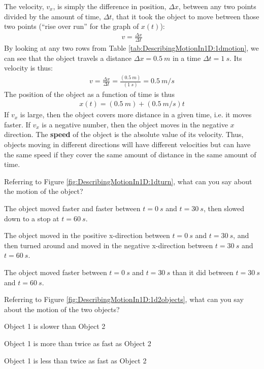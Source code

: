 The velocity, $v_x$, is simply the difference in position, $\Delta x$, between any two points divided by the amount of time, $\Delta t$, that it took the object to move between those two points (``rise over run'' for the graph of $x(t)$):
\begin{align*}
v = \frac{\Delta x}{\Delta t}
\end{align*}
By looking at any two rows from Table \ref{tab:DescribingMotionIn1D:1dmotion}, we can see that the object travels a distance $\Delta x=\SI{0.5}{m}$ in a time $\Delta t=\SI{1}{s}$. Its velocity is thus:
\begin{align*}
v = \frac{\Delta x}{\Delta t} = \frac{(\SI{0.5}{m})}{(\SI{1}{s})}=\SI{0.5}{m/s}
\end{align*}
The position of the object as a function of time is thus
\begin{align*}
x(t) = (\SI{0.5}{m}) + (\SI{0.5}{m/s}) t
\end{align*}
If $v_x$ is large, then the object covers more distance in a given time, i.e. it moves faster. If $v_x$ is a negative number, then the object moves in the negative $x$ direction. The \textbf{speed} of the object is the absolute value of its velocity. Thus, objects moving in different directions will have different velocities but can have the same speed if they cover the same amount of distance in the same amount of time.
\newpage
\begin{checkpoint}
\begin{MCquestion}{Referring to Figure \ref{fig:DescribingMotionIn1D:1dturn}, what can you say about the motion of the object? }
\item The object moved faster and faster between $t=\SI{0}{s}$ and $t=\SI{30}{s}$, then slowed down to a stop at $t=\SI{60}{s}$.
\item The object moved in the positive x-direction between $t=\SI{0}{s}$ and $t=\SI{30}{s}$, and then turned around and moved in the negative x-direction between $t=\SI{30}{s}$ and $t=\SI{60}{s}$. \correct
\item The object moved faster between $t=\SI{0}{s}$ and $t=\SI{30}{s}$ than it did between $t=\SI{30}{s}$ and $t=\SI{60}{s}$.
\end{MCquestion}
\end{checkpoint}

\begin{checkpoint}
\begin{MCquestion}{Referring to Figure \ref{fig:DescribingMotionIn1D:1d2objects}, what can you say about the motion of the two objects? }
\item Object 1 is slower than Object 2
\item Object 1 is more than twice as fast as Object 2 \correct
\item Object 1 is less than twice as fast as Object 2
\end{MCquestion}
\end{checkpoint}

